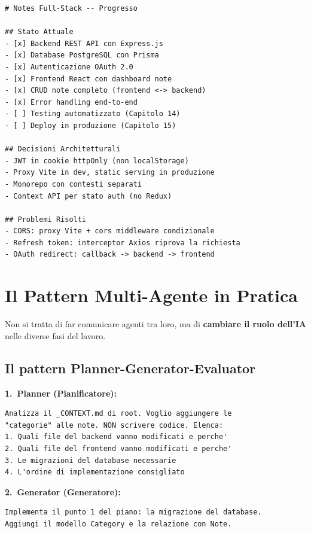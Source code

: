 \begin{praticabox}[title={Pratica --- Crea \texttt{PROGRESS.md}}]
\begin{lstlisting}[language={},title={Esempio di file di progresso}]
# Notes Full-Stack -- Progresso

## Stato Attuale
- [x] Backend REST API con Express.js
- [x] Database PostgreSQL con Prisma
- [x] Autenticazione OAuth 2.0
- [x] Frontend React con dashboard note
- [x] CRUD note completo (frontend <-> backend)
- [x] Error handling end-to-end
- [ ] Testing automatizzato (Capitolo 14)
- [ ] Deploy in produzione (Capitolo 15)

## Decisioni Architetturali
- JWT in cookie httpOnly (non localStorage)
- Proxy Vite in dev, static serving in produzione
- Monorepo con contesti separati
- Context API per stato auth (no Redux)

## Problemi Risolti
- CORS: proxy Vite + cors middleware condizionale
- Refresh token: interceptor Axios riprova la richiesta
- OAuth redirect: callback -> backend -> frontend
\end{lstlisting}
\end{praticabox}

\section{Il Pattern Multi-Agente in Pratica}

Non si tratta di far comunicare agenti tra loro, ma di \textbf{cambiare il ruolo dell'IA} nelle diverse fasi del lavoro.

\subsection{Il pattern Planner-Generator-Evaluator}

\textbf{1.\ Planner (Pianificatore):}
\begin{lstlisting}[language={}]
Analizza il _CONTEXT.md di root. Voglio aggiungere le
"categorie" alle note. NON scrivere codice. Elenca:
1. Quali file del backend vanno modificati e perche'
2. Quali file del frontend vanno modificati e perche'
3. Le migrazioni del database necessarie
4. L'ordine di implementazione consigliato
\end{lstlisting}

\textbf{2.\ Generator (Generatore):}
\begin{lstlisting}[language={}]
Implementa il punto 1 del piano: la migrazione del database.
Aggiungi il modello Category e la relazione con Note.
\end{lstlisting}

